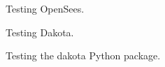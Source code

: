 \begin{figure}[!htbp]
  \caption{Testing OpenSees.}
  \label{fig:opensees_test}
\end{figure}

\begin{figure}[!htbp]
  \caption{Testing Dakota.}
  \label{fig:dakota_test}
\end{figure}

\begin{figure}[!htbp]
  \caption{Testing the dakota Python package.}
  \label{fig:dakota_py_test}
\end{figure}

